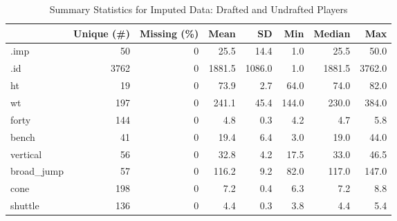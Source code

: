 \documentclass[12pt,english]{article}
\begin{document}
\begin{table}
\caption{Summary Statistics for Imputed Data: Drafted and Undrafted Players}
\centering
\begin{tabular}[t]{lrrrrrrr}
\toprule
  & Unique (\#) & Missing (\%) & Mean & SD & Min & Median & Max\\
\midrule
.imp & 50 & 0 & \num{25.5} & \num{14.4} & \num{1.0} & \num{25.5} & \num{50.0}\\
.id & 3762 & 0 & \num{1881.5} & \num{1086.0} & \num{1.0} & \num{1881.5} & \num{3762.0}\\
ht & 19 & 0 & \num{73.9} & \num{2.7} & \num{64.0} & \num{74.0} & \num{82.0}\\
wt & 197 & 0 & \num{241.1} & \num{45.4} & \num{144.0} & \num{230.0} & \num{384.0}\\
forty & 144 & 0 & \num{4.8} & \num{0.3} & \num{4.2} & \num{4.7} & \num{5.8}\\
bench & 41 & 0 & \num{19.4} & \num{6.4} & \num{3.0} & \num{19.0} & \num{44.0}\\
vertical & 56 & 0 & \num{32.8} & \num{4.2} & \num{17.5} & \num{33.0} & \num{46.5}\\
broad\_jump & 57 & 0 & \num{116.2} & \num{9.2} & \num{82.0} & \num{117.0} & \num{147.0}\\
cone & 198 & 0 & \num{7.2} & \num{0.4} & \num{6.3} & \num{7.2} & \num{8.8}\\
shuttle & 136 & 0 & \num{4.4} & \num{0.3} & \num{3.8} & \num{4.4} & \num{5.4}\\
\bottomrule
\end{tabular}
\end{table}
\end{document}

